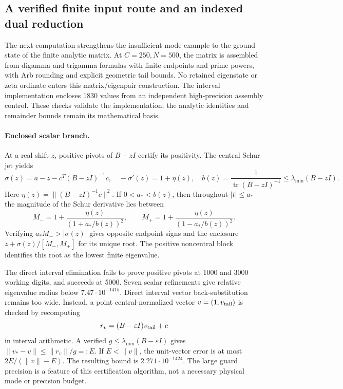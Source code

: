 \subsection{A verified finite input route and an indexed dual reduction}
\label{ssec:certified-input-route}

The next computation strengthens the insufficient-mode example to the
ground state of the finite analytic matrix. At $C=250,N=500$, the matrix
is assembled from digamma and trigamma formulas with finite endpoints and prime
powers, with Arb rounding and explicit geometric tail bounds. No retained
eigenstate or zeta ordinate enters this matrix/eigenpair construction.
The interval implementation encloses 1830 values from an independent
high-precision assembly control. These checks validate the implementation;
the analytic identities and remainder bounds remain its mathematical basis.

\paragraph{Enclosed scalar branch.}
At a real shift $z$, positive pivots of $B-zI$ certify its positivity.
The central Schur jet yields
\[
 \sigma(z)=a-z-c^T(B-zI)^{-1}c,\quad
 -\sigma'(z)=1+\eta(z),\quad
 b(z)=\frac1{\operatorname{tr}(B-zI)^{-1}}
       \le\lambda_{\min}(B-zI).
\]
Here $\eta(z)=\|(B-zI)^{-1}c\|^2$. If $0<a_*<b(z)$, then throughout
$|t|\le a_*$ the magnitude of the Schur derivative lies between
\[
 M_-=1+\frac{\eta(z)}{(1+a_*/b(z))^2},\qquad
 M_+=1+\frac{\eta(z)}{(1-a_*/b(z))^2}.
\]
Verifying $a_*M_->|\sigma(z)|$ gives opposite endpoint signs and the
enclosure $z+\sigma(z)/[M_-,M_+]$ for its unique root. The positive
noncentral block identifies this root as the lowest finite eigenvalue.

The direct interval elimination fails to prove positive pivots at 1000
and 3000 working digits, and succeeds at 5000. Seven scalar refinements
give relative eigenvalue radius below $7.47\cdot10^{-1415}$. Direct
interval vector back-substitution remains too wide. Instead, a point
central-normalized vector $v=(1,v_{\rm tail})$ is checked by recomputing
\[
 r_v=(B-\varepsilon I)v_{\rm tail}+c
\]
in interval arithmetic. A verified $g\le\lambda_{\min}(B-\varepsilon I)$
gives $\|v_*-v\|\le\|r_v\|/g=:E$. If $E<\|v\|$, the unit-vector
error is at most $2E/(\|v\|-E)$. The resulting bound is
$2.271\cdot10^{-1424}$. The large guard precision is a feature of this
certification algorithm, not a necessary physical mode or precision budget.

